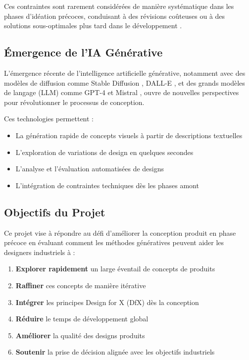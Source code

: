 Ces contraintes sont rarement considérées de manière systématique dans les phases d'idéation précoces, conduisant à des révisions coûteuses ou à des solutions sous-optimales plus tard dans le développement \cite{elmontassir2024leveraging}.

\subsection{Émergence de l'IA Générative}

L'émergence récente de l'intelligence artificielle générative, notamment avec des modèles de diffusion comme Stable Diffusion \cite{rombach2022high}, DALL-E \cite{ramesh2021zero}, et des grands modèles de langage (LLM) comme GPT-4 \cite{openai2023gpt4} et Mistral \cite{jiang2023mistral}, ouvre de nouvelles perspectives pour révolutionner le processus de conception.

Ces technologies permettent :
\begin{itemize}[leftmargin=*]
    \item La génération rapide de concepts visuels à partir de descriptions textuelles
    \item L'exploration de variations de design en quelques secondes
    \item L'analyse et l'évaluation automatisées de designs
    \item L'intégration de contraintes techniques dès les phases amont
\end{itemize}

\subsection{Objectifs du Projet}

Ce projet vise à répondre au défi d'améliorer la conception produit en phase précoce en évaluant comment les méthodes génératives peuvent aider les designers industriels à :

\begin{enumerate}[leftmargin=*]
    \item \textbf{Explorer rapidement} un large éventail de concepts de produits
    \item \textbf{Raffiner} ces concepts de manière itérative
    \item \textbf{Intégrer} les principes Design for X (DfX) dès la conception
    \item \textbf{Réduire} le temps de développement global
    \item \textbf{Améliorer} la qualité des designs produits
    \item \textbf{Soutenir} la prise de décision alignée avec les objectifs industriels
\end{enumerate}


